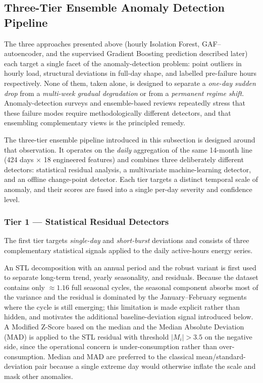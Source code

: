 \documentclass{article}
\begin{document}




\subsection{Three-Tier Ensemble Anomaly Detection Pipeline}

The three approaches presented above (hourly Isolation Forest, GAF--autoencoder, and the supervised Gradient Boosting prediction described later) each target a single facet of the anomaly-detection problem: point outliers in hourly load, structural deviations in full-day shape, and labelled pre-failure hours respectively. None of them, taken alone, is designed to separate a \emph{one-day sudden drop} from a \emph{multi-week gradual degradation} or from a \emph{permanent regime shift}. Anomaly-detection surveys \cite{chandola2009anomaly,aggarwal2017outlier} and ensemble-based reviews \cite{aggarwal2017ensemble,zhang2023ensemble} repeatedly stress that these failure modes require methodologically different detectors, and that ensembling complementary views is the principled remedy.

The three-tier ensemble pipeline introduced in this subsection is designed around that observation. It operates on the \emph{daily} aggregation of the same 14-month line (424 days $\times$ 18 engineered features) and combines three deliberately different detectors: statistical residual analysis, a multivariate machine-learning detector, and an offline change-point detector. Each tier targets a distinct temporal scale of anomaly, and their scores are fused into a single per-day severity and confidence level.

\subsubsection{Tier 1 --- Statistical Residual Detectors}

The first tier targets \emph{single-day} and \emph{short-burst} deviations and consists of three complementary statistical signals applied to the daily active-hours energy series.

An STL decomposition \cite{cleveland1990stl} with an annual period and the robust variant is first used to separate long-term trend, yearly seasonality, and residuals. Because the dataset contains only $\approx\!1.16$ full seasonal cycles, the seasonal component absorbs most of the variance and the residual is dominated by the January--February segments where the cycle is still emerging; this limitation is made explicit rather than hidden, and motivates the additional baseline-deviation signal introduced below. A Modified Z-Score \cite{iglewicz1993outliers} based on the median and the Median Absolute Deviation (MAD) is applied to the STL residual with threshold $|M_i|>3.5$ on the negative side, since the operational concern is under-consumption rather than over-consumption. Median and MAD are preferred to the classical mean/standard-deviation pair because a single extreme day would otherwise inflate the scale and mask other anomalies.
\end{document}
